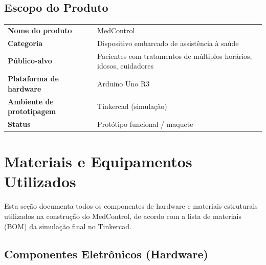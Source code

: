 \documentclass[11pt,a4paper]{article}
\begin{document}
\subsection{Escopo do Produto}

\begin{specbox}
\begin{tabularx}{\linewidth}{@{}l Y@{}}
\textbf{Nome do produto} & MedControl \\
\textbf{Categoria} & Dispositivo embarcado de assistência à saúde \\
\textbf{Público-alvo} & Pacientes com tratamentos de múltiplos horários, idosos, cuidadores \\
\textbf{Plataforma de hardware} & Arduino Uno R3 \\
\textbf{Ambiente de prototipagem} & Tinkercad (simulação) \\
\textbf{Status} & Protótipo funcional / maquete \\
\end{tabularx}
\end{specbox}

\newpage
\section{Materiais e Equipamentos Utilizados}

Esta seção documenta todos os componentes de hardware e materiais estruturais utilizados na construção do MedControl, de acordo com a lista de materiais (BOM) da simulação final no Tinkercad.

\subsection{Componentes Eletrônicos (Hardware)}
\end{document}
